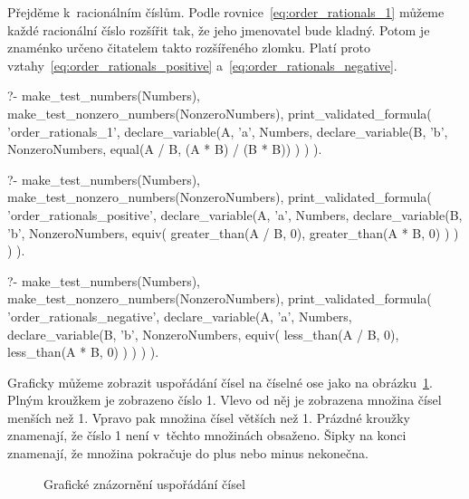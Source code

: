 Přejděme k~racionálním číslům. Podle rovnice~\eqref{eq:order_rationals_1} můžeme každé racionální číslo rozšířit tak, že jeho jmenovatel bude kladný. Potom je znaménko určeno čitatelem takto rozšířeného zlomku. Platí proto vztahy~\eqref{eq:order_rationals_positive} a~\eqref{eq:order_rationals_negative}.

\begin{prolog}
?-	make_test_numbers(Numbers),
	make_test_nonzero_numbers(NonzeroNumbers),
	print_validated_formula(
		'order_rationals_1',
		declare_variable(A, 'a', Numbers,
			declare_variable(B, 'b', NonzeroNumbers,
				equal(A / B, (A * B) / (B * B))
			)
		)
	).
\end{prolog}

\begin{fact}
\begin{prolog}
?-	make_test_numbers(Numbers),
	make_test_nonzero_numbers(NonzeroNumbers),
	print_validated_formula(
		'order_rationals_positive',
		declare_variable(A, 'a', Numbers,
			declare_variable(B, 'b', NonzeroNumbers,
				equiv(
					greater_than(A / B, 0),
					greater_than(A * B, 0)
				)
			)
		)
	).
\end{prolog}
\begin{prolog}
?-	make_test_numbers(Numbers),
	make_test_nonzero_numbers(NonzeroNumbers),
	print_validated_formula(
		'order_rationals_negative',
		declare_variable(A, 'a', Numbers,
			declare_variable(B, 'b', NonzeroNumbers,
				equiv(
					less_than(A / B, 0),
					less_than(A * B, 0)
				)
			)
		)
	).
\end{prolog}
\end{fact}

Graficky můžeme zobrazit uspořádání čísel na číselné ose jako na obrázku~\ref{img:ordering}. Plným kroužkem je zobrazeno číslo 1. Vlevo od něj je zobrazena množina čísel menších než 1. Vpravo pak množina čísel větších než 1. Prázdné kroužky znamenají, že číslo 1 není v~těchto množinách obsaženo. Šipky na konci znamenají, že množina pokračuje do plus nebo minus nekonečna. 

\begin{figure}[!h]
\centering
{}
\caption{Grafické znázornění uspořádání čísel}
\label{img:ordering}
\end{figure}

